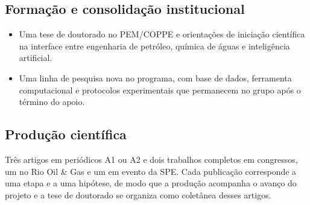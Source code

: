 \documentclass[10pt,a4paper]{article}
\begin{document}
\subsection{Formação e consolidação institucional}
\begin{itemize}
  \item Uma tese de doutorado no PEM/COPPE e orientações de iniciação científica na
        interface entre engenharia de petróleo, química de águas e inteligência
        artificial.
  \item Uma linha de pesquisa nova no programa, com base de dados, ferramenta computacional e protocolos
        experimentais que permanecem no grupo após o término do apoio.
\end{itemize}

\subsection{Produção científica}
Três artigos em periódicos A1 ou A2 e dois trabalhos
completos em congressos, um no Rio Oil \& Gas e um em evento da SPE. Cada publicação
corresponde a uma etapa e a uma hipótese, de modo que a produção acompanha o avanço do
projeto e a tese de doutorado se organiza como coletânea desses artigos.
\end{document}
